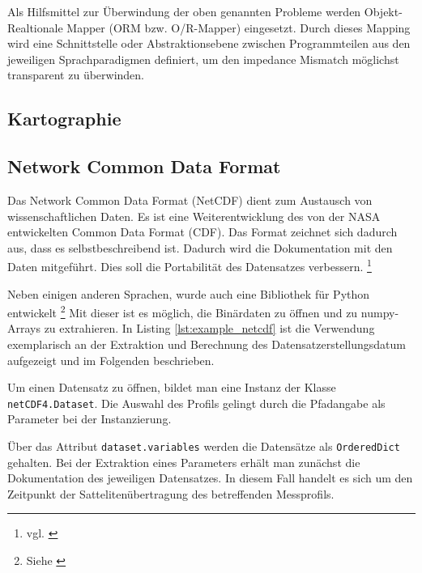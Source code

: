Als Hilfsmittel zur Überwindung der oben genannten Probleme werden Objekt-Realtionale Mapper (ORM bzw. O/R-Mapper) eingesetzt. Durch dieses Mapping wird eine Schnittstelle oder Abstraktionsebene zwischen Programmteilen aus den jeweiligen Sprachparadigmen definiert, um den impedance Mismatch möglichst transparent zu überwinden.




    

    \subsection{Kartographie}

    \subsection{Network Common Data Format}
    
    Das Network Common Data Format (NetCDF) dient zum Austausch von wissenschaftlichen Daten. Es ist eine Weiterentwicklung des von der NASA entwickelten Common Data Format (CDF). Das Format zeichnet sich dadurch aus, dass es selbstbeschreibend ist. Dadurch wird die Dokumentation mit den Daten mitgeführt. Dies soll die Portabilität des Datensatzes verbessern.  \footnote{vgl. \cite{FisherNetCDF}}
   
    Neben einigen anderen Sprachen, wurde auch eine Bibliothek für Python entwickelt \footnote{Siehe \cite{netCDF4}} Mit dieser ist es möglich, die Binärdaten zu öffnen und zu numpy-Arrays zu extrahieren. In Listing \ref{lst:example_netcdf} ist die Verwendung exemplarisch an der Extraktion und Berechnung des Datensatzerstellungsdatum aufgezeigt und im Folgenden beschrieben.
    
    
    Um einen Datensatz zu öffnen, bildet man eine Instanz der Klasse \texttt{netCDF4.Dataset}. Die Auswahl des Profils gelingt durch die Pfadangabe als Parameter bei der Instanzierung.
    
    Über das Attribut \texttt{dataset.variables} werden die Datensätze als \texttt{OrderedDict} gehalten. Bei der Extraktion eines Parameters erhält man zunächst die Dokumentation des jeweiligen Datensatzes. In diesem Fall handelt es sich um den Zeitpunkt der Sattelitenübertragung des betreffenden Messprofils.
    
